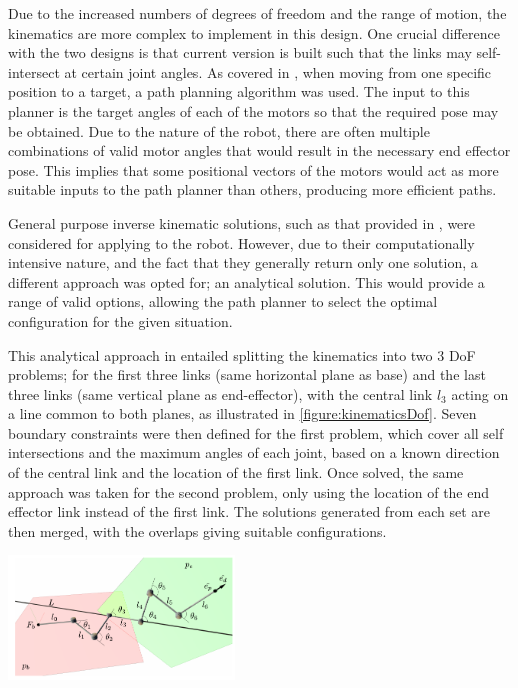 \documentclass[11pt]{article}
\begin{document}
Due to the increased numbers of degrees of freedom and the range of motion, the kinematics are more complex to implement in this design. One crucial difference with the two designs is that current version is built such that the links may self-intersect at certain joint angles. As covered in \cite{GreggSmithKinematics}, when moving from one specific position to a target, a path planning algorithm was used. The input to this planner is the target angles of each of the motors so that the required pose may be obtained. Due to the nature of the robot, there are often multiple combinations of valid motor angles that would result in the necessary end effector pose. This implies that some positional vectors of the motors would act as more suitable inputs to the path planner than others, producing more efficient paths.

General purpose inverse kinematic solutions, such as that provided in \cite{Aristidou2011}, were considered for applying to the robot. However, due to their computationally intensive nature, and the fact that they generally return only one solution, a different approach was opted for; an analytical solution. This would provide a range of valid options, allowing the path planner to select the optimal configuration for the given situation. 

This analytical approach in \cite{GreggSmithKinematics} entailed splitting the kinematics into two 3 DoF problems; for the first three links (same horizontal plane as base) and the last three links (same vertical plane as end-effector), with the central link \(l_3\) acting on a line common to both planes, as illustrated in \ref{figure:kinematicsDof}. Seven boundary constraints were then defined for the first problem, which cover all self intersections and the maximum angles of each joint, based on a known direction of the central link and the location of the first link. Once solved, the same approach was taken for the second problem, only using the location of the end effector link instead of the first link. The solutions generated from each set are then merged, with the overlaps giving suitable configurations. 

\begin{center}
\includegraphics[width=0.45\textwidth]{kinematicsDof.png}
\label{figure:kinematicsDof}
\end{center}
\end{document}
